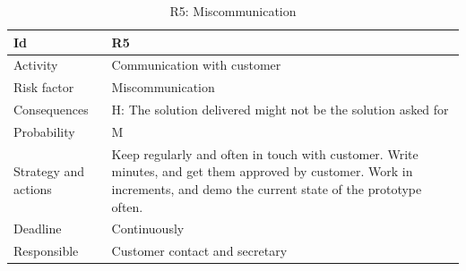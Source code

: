 \documentclass[11pt]{book}
\begin{document}
\begin{table}[H]
\centering
\begin{tabular}{ l  p{11cm} }
    Id                      & R5                                                                          \\ \hline
    Activity                & Communication with customer                                                 \\ \hline
    Risk factor             & Miscommunication                                                            \\ \hline
    Consequences            & H: The solution delivered might not be the solution asked for               \\ \hline
    Probability             & M                                                                           \\ \hline
    Strategy and actions    & Keep regularly and often in touch with customer. Write minutes, and get 
                              them approved by customer. Work in increments, and demo the current 
                              state of the prototype often.                                               \\ \hline
    Deadline                & Continuously                                                                \\ \hline
    Responsible             & Customer contact and secretary                                              \\ 
\end{tabular}
\label{tab:risk_5}
\caption{R5: Miscommunication}
\end{table}
\end{document}
